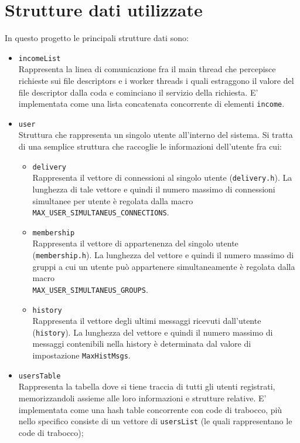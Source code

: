 \documentclass[a4paper,12pt]{report}
\begin{document}
\section*{Strutture dati utilizzate}
In questo progetto le principali strutture dati sono:
\begin{itemize}
\item \texttt{incomeList}\\ Rappresenta la linea di comunicazione fra il main thread che percepisce richieste sui file descriptors
  e i worker threads i quali estraggono il valore del file descriptor dalla coda e cominciano il servizio della richiesta.
  E' implementata come una lista concatenata concorrente di elementi \texttt{income}.
\item \texttt{user}\\ Struttura che rappresenta un singolo utente all'interno del sistema. Si tratta di una semplice struttura che
  raccoglie le informazioni dell'utente fra cui:
  \begin{itemize}
  \item \texttt{delivery}\\ Rappresenta il vettore di connessioni al singolo utente (\texttt{delivery.h}).
    La lunghezza di tale vettore e quindi il numero massimo di connessioni simultanee per utente è regolata dalla macro\\
    \texttt{MAX\_USER\_SIMULTANEUS\_CONNECTIONS}.
  \item \texttt{membership}\\ Rappresenta il vettore di appartenenza del singolo utente (\texttt{membership.h}).
    La lunghezza del vettore e quindi il numero massimo di gruppi a cui un utente può appartenere simultaneamente è regolata dalla macro\\
    \texttt{MAX\_USER\_SIMULTANEUS\_GROUPS}.
  \item \texttt{history}\\ Rappresenta il vettore degli ultimi messaggi ricevuti dall'utente (\texttt{history}). La lunghezza del vettore e
    quindi il numero massimo di messaggi contenibili nella history è determinata dal valore di impostazione \texttt{MaxHistMsgs}.
  \end{itemize}
\item \texttt{usersTable}\\ Rappresenta la tabella dove si tiene traccia di tutti gli utenti registrati, memorizzandoli assieme alle loro informazioni e strutture relative.
  E' implementata come una hash table concorrente con code di trabocco, più nello specifico consiste di un vettore di \texttt{usersList} (le quali rappresentano le code di trabocco);

\end{itemize}
\end{document}
